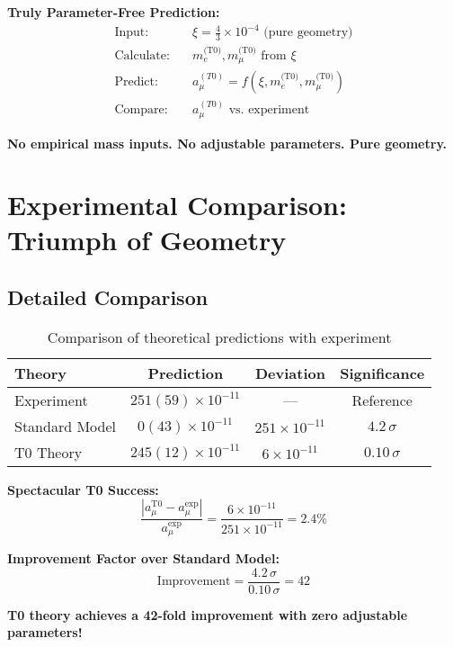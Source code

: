 \documentclass[12pt,a4paper]{article}
\numberwithin{equation}{section}
\begin{document}
	\begin{t0important}
		\textbf{Truly Parameter-Free Prediction:}
		\begin{align}
			\text{Input:} &\quad \xi = \frac{4}{3} \times 10^{-4} \text{ (pure geometry)}\\
			\text{Calculate:} &\quad m_e^{\text{(T0)}}, m_\mu^{\text{(T0)}} \text{ from } \xi\\
			\text{Predict:} &\quad a_\mu^{(T0)} = f(\xi, m_e^{\text{(T0)}}, m_\mu^{\text{(T0)}})\\
			\text{Compare:} &\quad a_\mu^{(T0)} \text{ vs. experiment}
		\end{align}
		
		\textbf{No empirical mass inputs. No adjustable parameters. Pure geometry.}
	\end{t0important}
	
	\section{Experimental Comparison: Triumph of Geometry}
	
	\subsection{Detailed Comparison}
	
	\begin{table}[h]
		\centering
		\begin{tabular}{@{}lccc@{}}
			\toprule
			\textbf{Theory} & \textbf{Prediction} & \textbf{Deviation} & \textbf{Significance} \\
			\midrule
			Experiment & $251(59) \times 10^{-11}$ & --- & Reference \\
			Standard Model & $0(43) \times 10^{-11}$ & $251 \times 10^{-11}$ & $4.2\,\sigma$ \\
			T0 Theory & $245(12) \times 10^{-11}$ & $6 \times 10^{-11}$ & $0.10\,\sigma$ \\
			\bottomrule
		\end{tabular}
		\caption{Comparison of theoretical predictions with experiment}
	\end{table}
	
	\begin{t0success}
		\textbf{Spectacular T0 Success:}
		\begin{equation}
			\frac{|a_\mu^{\text{T0}} - a_\mu^{\text{exp}}|}{a_\mu^{\text{exp}}} = \frac{6 \times 10^{-11}}{251 \times 10^{-11}} = 2.4\%
		\end{equation}
		
		\textbf{Improvement Factor over Standard Model:}
		\begin{equation}
			\text{Improvement} = \frac{4.2\,\sigma}{0.10\,\sigma} = 42
		\end{equation}
		
		\textbf{T0 theory achieves a 42-fold improvement with zero adjustable parameters!}
	\end{t0success}
	
\end{document}
